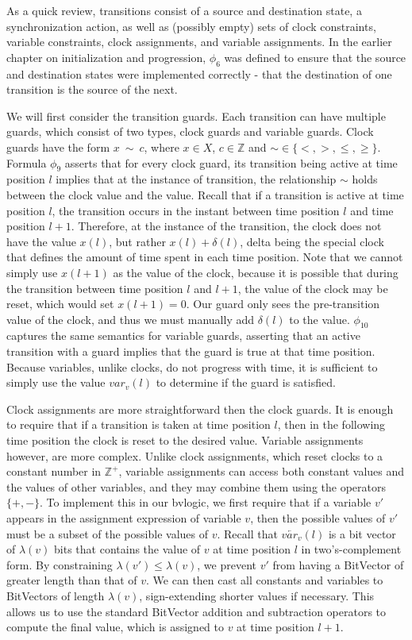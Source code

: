 \documentclass[a4paper,12pt]{article}
\begin{document}
As a quick review, transitions consist of a source and destination state, a
synchronization action, as well as (possibly empty) sets of clock constraints,
variable constraints, clock assignments, and variable assignments. In the
earlier chapter on initialization and progression, \(\phi_6\) was defined to
ensure that the source and destination states were implemented correctly - that
the destination of one transition is the source of the next.


We will first consider the transition guards. Each transition can have multiple
guards, which consist of two types, clock guards and variable guards. Clock
guards have the form \(x\ \sim\ c\), where \(x \in X\), \(c \in \mathbb{Z}\) and
\(\sim \in \{<,>,\leq,\geq\}\). Formula \(\phi_9\) asserts that for every clock
guard, its transition being active at time position \(l\) implies that at the
instance of transition, the relationship \(\sim\) holds between the clock value
and the value. Recall that if a transition is active at time position \(l\), the
transition occurs in the instant between time position \(l\) and time position
\(l+1\). Therefore, at the instance of the transition, the clock does not have
the value \(x(l)\), but rather \(x(l) + \delta(l)\), delta being the special
clock that defines the amount of time spent in each time position. Note that we
cannot simply use \(x(l+1)\) as the value of the clock, because it is possible
that during the transition between time position \(l\) and \(l+1\), the value of
the clock may be reset, which would set \(x(l+1)=0\). Our guard only sees the
pre-transition value of the clock, and thus we must manually add \(\delta(l)\)
to the value. \(\phi_{10}\) captures the same semantics for variable guards,
asserting that an active transition with a guard implies that the guard is true
at that time position. Because variables, unlike clocks, do not progress with
time, it is sufficient to simply use the value \(var_{v}(l)\) to determine if
the guard is satisfied.

Clock assignments are more straightforward then the clock guards. It is enough
to require that if a transition is taken at time position \(l\), then in the
following time position the clock is reset to the desired value. Variable
assignments however, are more complex. Unlike clock assignments, which reset
clocks to a constant number in \(\mathbb{Z}^+\), variable assignments can access
both constant values and the values of other variables, and they may combine
them using the operators \(\{+,-\}\). To implement this in our bvlogic, we first
require that if a variable \(v'\) appears in the assignment expression of
variable \(v\), then the possible values of \(v'\) must be a subset of the
possible values of \(v\). Recall that \(\overleftarrow{var_v}(l)\) is a bit
vector of \(\lambda(v)\) bits that contains the value of \(v\) at time position
\(l\) in two's-complement form. By constraining \(\lambda(v') \leq \lambda(v)\), we prevent
\(v'\) from having a BitVector of greater length than that of \(v\). We can then
cast all constants and variables to BitVectors of length \(\lambda(v)\),
sign-extending shorter values if necessary. This allows us to use the
standard BitVector addition and subtraction operators to compute the final
value, which is assigned to \(v\) at time position \(l{+}1\).
\end{document}
